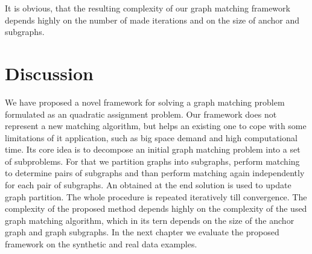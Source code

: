 It is obvious, that the resulting complexity of our graph matching framework depends highly on the number of made iterations and on the size of anchor and subgraphs.




\section{Discussion}
We have proposed a novel framework for solving a graph matching problem formulated as an quadratic assignment problem. Our framework does not represent a new matching algorithm, but helps an existing one to cope with some limitations of it application, such as big space demand and high computational time. Its core idea is to decompose an initial graph matching problem into a set of subproblems. For that we partition graphs into subgraphs, perform matching to determine pairs of subgraphs and than perform matching again independently for each pair of subgraphs. An obtained at the end solution is used to update graph partition. The whole procedure is repeated iteratively till convergence. The complexity of the proposed method depends highly on the complexity of the used graph matching algorithm, which in its tern depends on the size of the anchor graph and graph subgraphs. In the next chapter we evaluate the proposed framework on the synthetic and real data examples.
